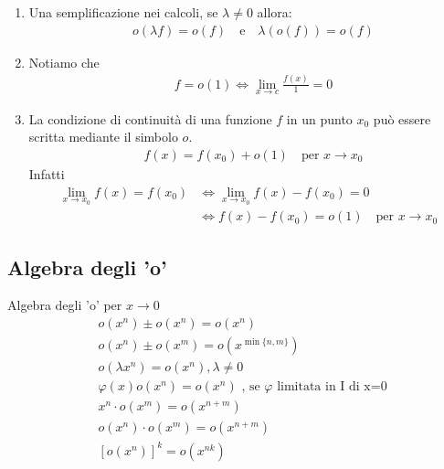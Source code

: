 \documentclass{book}
\begin{document}
\begin{minipage}{\textwidth}
\begin{proposition}
\begin{enumerate}[label=\roman*., start=1]
            \item Una semplificazione nei calcoli, se \(\lambda \neq 0\) allora:
                  \begin{align*}
                       & o(\lambda f) = o(f) \quad \text{e} \quad \lambda(o(f)) = o(f)
                  \end{align*}
            \item Notiamo che
                  \begin{align*}
                       & f = o(1) \iff \lim_{x \to c} \frac{f(x)}{1} = 0
                  \end{align*}
            \item La condizione di continuità di una funzione \(f\) in un punto \(x_0\) può essere scritta mediante il simbolo \(o\).
                  \begin{align*}
                       & f(x) = f(x_0) + o(1) \quad \text{per } x \to x_0
                  \end{align*}
                  Infatti
                  \begin{align*}
                      \lim_{x \to x_0} f(x) = f(x_0) & \iff \lim_{x \to x_0} f(x) - f(x_0) = 0               \\
                                                     & \iff f(x) - f(x_0) = o(1) \quad \text{per } x \to x_0
                  \end{align*}
        \end{enumerate}
    \end{proposition}
\end{minipage}
\begin{proposition}
    \subsection{Algebra degli 'o'}
    Algebra degli 'o' per \(x \to 0\)
    \begin{align*}
         & o(x^n) \pm o(x^n) = o(x^n)                                                    \\
         & o(x^n) \pm o(x^m) = o(x^{\min\{n,m\}})                                        \\
         & o(\lambda x^n) = o(x^n), \lambda \neq 0                                       \\
         & \varphi(x) o(x^n) = o(x^n) \text{ , se } \varphi \text{ limitata in I di x=0} \\
         & x^n \cdot o(x^m) = o(x^{n+m})                                                 \\
         & o(x^n) \cdot o(x^m) = o(x^{n+m})                                              \\
         & [o(x^n)]^k = o(x^{nk})
    \end{align*}
\end{proposition}
\end{document}
